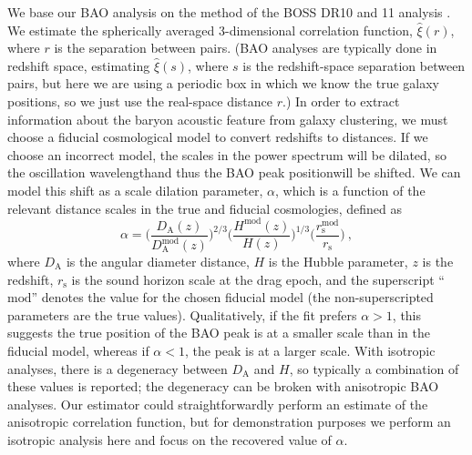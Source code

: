 We base our BAO analysis on the method of the BOSS DR10 and 11 analysis \citep{Anderson2014}.
We estimate the spherically averaged 3-dimensional correlation function, $\hat{\xi}(r)$, where $r$ is the separation between pairs.
(BAO analyses are typically done in redshift space, estimating $\hat{\xi}(s)$, where $s$ is the redshift-space separation between pairs, but here we are using a periodic box in which we know the true galaxy positions, so we just use the real-space distance $r$.)
In order to extract information about the baryon acoustic feature from galaxy clustering, we must choose a fiducial cosmological model to convert redshifts to distances.
If we choose an incorrect model, the scales in the power spectrum will be dilated, so the oscillation wavelength{\emdash}and thus the BAO peak position{\emdash}will be shifted.
We can model this shift as a scale dilation parameter, $\alpha$, which is a function of the relevant distance scales in the true and fiducial cosmologies, defined as
\begin{equation} \label{eq:alpha}
\alpha = \Bigg( \frac{D_\mathrm{A}(z)}{D_\mathrm{A}^{\text{mod}}(z)} \Bigg)^{2/3} \Bigg( \frac{H^{\text{mod}}(z)}{H(z)} \Bigg)^{1/3} \Bigg( \frac{r_\mathrm{s}^{\text{mod}}}{r_\mathrm{s}} \Bigg) ~,
\end{equation}
where $D_\mathrm{A}$ is the angular diameter distance, $H$ is the Hubble parameter, $z$ is the redshift, $r_\mathrm{s}$ is the sound horizon scale at the drag epoch, and the superscript ``$\text{mod}$'' denotes the value for the chosen fiducial model (the non-superscripted parameters are the true values).
Qualitatively, if the fit prefers $\alpha>1$, this suggests the true position of the BAO peak is at a smaller scale than in the fiducial model, whereas if $\alpha<1$, the peak is at a larger scale.
With isotropic analyses, there is a degeneracy between $D_\mathrm{A}$ and $H$, so typically a combination of these values is reported; the degeneracy can be broken with anisotropic BAO analyses.
Our estimator could straightforwardly perform an estimate of the anisotropic correlation function, but for demonstration purposes we perform an isotropic analysis here and focus on the recovered value of $\alpha$.

